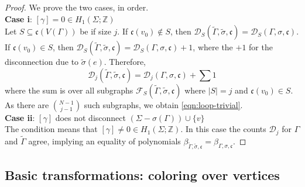 \documentclass[10pt, reqno]{amsart}
\newcommand{\Z}{\mathbb{Z}}
\newcommand{\bgd}{\begin{displaymath}}
\newcommand{\edd}{\end{displaymath}}
\theoremstyle{plain}
\theoremstyle{remark}
\theoremstyle{definition}
\numberwithin{equation}{section}
\begin{document}
\begin{proof}
We prove the two cases, in order.\\
\textbf{Case i}: $[\gamma]=0\in H_1(\Sigma;\Z)$\\
Let $S\subseteq \mathfrak{c}(V(\Gamma))$ be if size $j$. If $\mathfrak{c}(v_0)\not\in S$, then $\mathscr{D}_S(\tilde{\Gamma},\tilde{\sigma}, \mathfrak{c})=\mathscr{D}_S(\Gamma,\sigma, \mathfrak{c})$. If $\mathfrak{c}(v_0)\in S$, then $\mathscr{D}_S(\tilde{\Gamma},\tilde{\sigma}, \mathfrak{c})=\mathscr{D}_S(\Gamma,\sigma, \mathfrak{c})+1$, where the $+1$ for the disconnection due to $\tilde{\sigma}(e)$. Therefore,
\bgd
\mathscr{D}_j(\tilde{\Gamma},\tilde{\sigma},\mathfrak{c})=\mathscr{D}_j(\Gamma,\sigma,\mathfrak{c})+\sum 1
\edd
where the sum is over all subgraphs $\mathscr{F}_S(\tilde{\Gamma},\tilde{\sigma},\mathfrak{c})$ where $|S|=j$ and $\mathfrak{c}(v_0)\in S$. As there are ${N-1\choose j-1}$ such subgraphs, we obtain \eqref{eqn:loop-trivial}.\\
\textbf{Case ii}: $[\gamma]$ does not disconnect $(\Sigma-\sigma(\Gamma))\cup\{v\}$\\
The condition means that $[\gamma]\neq 0\in H_1(\Sigma;\Z)$. In this case the counts $\mathscr{D}_j$ for $\Gamma$ and $\tilde{\Gamma}$ agree, implying an equality of polynomials ${\beta}_{\tilde{\Gamma},\tilde{\sigma},\mathfrak{c}}={\beta}_{\Gamma,\sigma,\mathfrak{c}}$.
\end{proof}

\subsection{Basic transformations: coloring over vertices}\label{subsec:c=c'}
\end{document}
